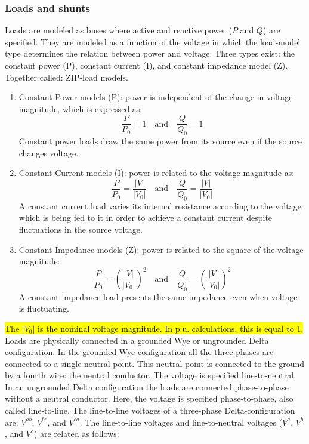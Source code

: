 \documentclass[10pt,journal]{article}
\begin{document}
\subsubsection{Loads and shunts}
Loads are modeled as buses where active and reactive power ($P$ and $Q$) are specified. They are modeled as a function of the voltage in which the load-model type determines the relation between power and voltage. Three types exist: the constant power (P), constant current (I), and constant impedance model (Z). Together called: ZIP-load models.    
\begin{enumerate}
    \item Constant Power models (P): power is independent of the change in voltage magnitude, which is expressed as: $$
    \frac{P}{P_0} =1 \quad\mbox{and}\quad \frac{Q}{Q_0}=1
    $$
    Constant power loads draw the same power from its source even if the source changes voltage.
    \item Constant Current models (I): power is related to the voltage magnitude as: $$
        \frac{P}{P_0} =\frac{|V|}{|V_0|} \quad\mbox{and}\quad \frac{Q}{Q_0}=\frac{|V|}{|V_0|}
    $$
    A constant current load varies its internal resistance according to the voltage which is being fed to it in order to achieve a constant current despite fluctuations in the source voltage.  
    \item Constant Impedance models (Z): power is related to the square of the voltage magnitude: $$
        \frac{P}{P_0} =(\frac{|V|}{|V_0|})^2 \quad\mbox{and}\quad \frac{Q}{Q_0}=(\frac{|V|}{|V_0|})^2
    $$
    A constant impedance load presents the same impedance even when voltage is fluctuating. 
\end{enumerate}
\hl{The $|V_0|$ is the nominal voltage magnitude. In p.u. calculations, this is equal to 1. }\\ 
Loads are physically connected in a grounded Wye or ungrounded Delta configuration. In the grounded Wye configuration all the three phases are connected to a single neutral point. This neutral point is connected to the ground by a fourth wire: the neutral conductor. The voltage is specified line-to-neutral.
In an ungrounded Delta configuration the loads are connected phase-to-phase without a neutral conductor. Here, the voltage is specified phase-to-phase, also called line-to-line. The line-to-line voltages of a three-phase Delta-configuration are: $V^{ab}$, $V^{bc}$, and $V^{ca}$.  The line-to-line voltages and line-to-neutral voltages ($V^a$, $V^b$, and $V^c$) are related as follows:
\end{document}
